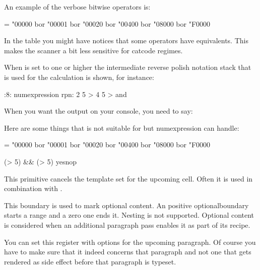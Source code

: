 An example of the verbose bitwise operators is:

\starttyping
\scratchcounter = \numexpression
    "00000 bor "00001 bor "00020 bor "00400 bor "08000 bor "F0000
\relax
\stoptyping

In the table you might have notices that some operators have equivalents. This
makes the scanner a bit less sensitive for catcode regimes.

When  is set to one or higher the intermediate \quote
{reverse polish notation} stack that is used for the calculation is shown, for
instance:

:8: {numexpression rpn: 2 5 > 4 5 > and}
\stoptyping

When you want the output on your console, you need to say:

\starttyping
{}
\stoptyping

Here are some things that  is not suitable for but \prm
{numexpression} can handle:

\starttyping
\scratchcounter = \numexpression
    "00000 bor "00001 bor "00020 bor "00400 bor "08000 bor "F0000
\relax

\ifcase \numexpression
    (\scratchcounterone > 5) && (\scratchcountertwo > 5)
\relax yes\else nop\fi
\stoptyping

\stopnewprimitive

\startoldprimitive[title={\prm {omit}}]

This primitive cancels the template set for the upcoming cell. Often it is used
in combination with .

\stopoldprimitive

\startnewprimitive[title={\prm {optionalboundary}}]

This boundary is used to mark optional content. An positive \prm
{optionalboundary} starts a range and a zero one ends it. Nesting is not
supported. Optional content is considered when an additional paragraph pass
enables it as part of its recipe.

\stopnewprimitive

\startnewprimitive[title={\prm {optionspar}}]

You can set this register with options for the upcoming paragraph. Of course you
have to make sure that it indeed concerns that paragraph and not one that gets
rendered as side effect before that paragraph is typeset. \stopnewprimitive

\startoldprimitive[title={\prm {or}}]

